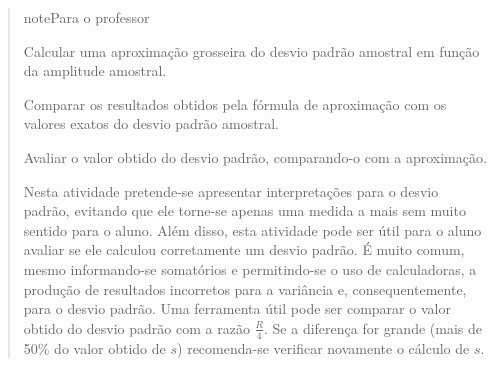 \begin{quote}

\begin{sphinxadmonition}{note}{Para o professor}


Calcular uma aproximação grosseira do desvio padrão amostral em função da amplitude amostral.

Comparar os resultados obtidos pela fórmula de aproximação com os valores exatos do desvio padrão amostral.

Avaliar o valor obtido do desvio padrão, comparando-o com a aproximação.


Nesta atividade pretende-se apresentar interpretações para o desvio padrão, evitando que ele torne-se apenas uma medida a mais sem muito sentido para o aluno. Além disso, esta atividade pode ser útil para o aluno avaliar se ele calculou corretamente um desvio padrão. É muito comum, mesmo informando-se somatórios e permitindo-se o uso de calculadoras, a produção de resultados incorretos para a variância e, consequentemente, para o desvio padrão. Uma ferramenta útil pode ser  comparar o valor obtido do desvio padrão com a razão \(\frac{R}{4}\). Se a diferença for grande (mais de 50\% do valor obtido de \(s\)) recomenda-se verificar novamente o cálculo de \(s\).
\end{sphinxadmonition}


\end{quote}

